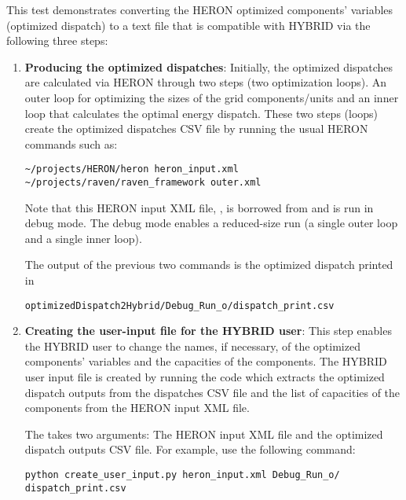 This test demonstrates converting the HERON optimized components' variables (optimized dispatch) to a text file that is compatible with HYBRID via the following three steps:
\begin{enumerate}

\item \textbf{Producing the optimized dispatches}: Initially, the optimized dispatches are calculated via HERON through two steps (two optimization loops). An outer loop for optimizing the sizes of the grid components/units and an inner loop that calculates the optimal energy dispatch. These two steps (loops) create the optimized dispatches CSV file by running the usual HERON commands such as:
\begin{lstlisting}
~/projects/HERON/heron heron_input.xml
~/projects/raven/raven_framework outer.xml
\end{lstlisting}
Note that this HERON input XML file, , is borrowed from  and is run in debug mode. The debug mode enables a reduced-size run (a single outer loop and a single inner loop). 

The output of the previous two commands is the optimized dispatch printed in
\begin{lstlisting}
optimizedDispatch2Hybrid/Debug_Run_o/dispatch_print.csv
\end{lstlisting}



\item \textbf{Creating the user-input file for the HYBRID user}: This step enables the HYBRID user to change the names, if necessary, of the optimized components' variables and the capacities of the components. The HYBRID user input file is created by running the code  which extracts the optimized dispatch outputs from the dispatches CSV file and the list of capacities of the components from the HERON input XML file.
 
 
The  takes two arguments: The HERON input XML file and the optimized dispatch outputs CSV file. For example, use the following command:
 \begin{lstlisting}
python create_user_input.py heron_input.xml Debug_Run_o/
dispatch_print.csv
  \end{lstlisting}
  
 
 

\end{enumerate}
